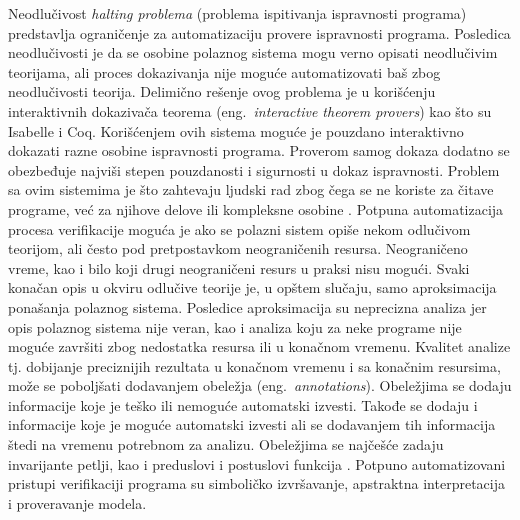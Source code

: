 \documentclass[12pt,oneside]{memoir}
\begin{document}
Neodlučivost \textit{halting problema} (problema ispitivanja ispravnosti programa) predstavlja ograničenje za automatizaciju provere ispravnosti programa. Posledica neodlučivosti je da se osobine polaznog sistema mogu verno opisati neodlučivim teorijama, ali proces dokazivanja nije moguće automatizovati baš zbog neodlučivosti teorija. Delimično rešenje ovog problema je u korišćenju interaktivnih dokazivača teorema (eng.~\textit{interactive theorem provers}) kao što su Isabelle i Coq. Korišćenjem ovih sistema moguće je pouzdano interaktivno dokazati razne osobine ispravnosti programa. Proverom samog dokaza dodatno se obezbeđuje najviši stepen pouzdanosti i sigurnosti u dokaz ispravnosti. Problem sa ovim sistemima je što zahtevaju ljudski rad zbog čega se ne koriste za čitave programe, već za njihove delove ili kompleksne osobine \cite{mvj}. 
Potpuna automatizacija procesa verifikacije moguća je ako se polazni sistem opiše nekom odlučivom teorijom, ali često pod pretpostavkom neograničenih resursa. Neograničeno vreme, kao i bilo koji drugi neograničeni resurs u praksi nisu mogući. Svaki konačan opis u okviru odlučive teorije je, u opštem slučaju, samo aproksimacija ponašanja polaznog sistema. Posledice aproksimacija su neprecizna analiza jer opis polaznog sistema nije veran, kao i analiza koju za neke programe nije moguće završiti zbog nedostatka resursa ili u konačnom vremenu. 
Kvalitet analize tj. dobijanje preciznijih rezultata u konačnom vremenu i sa konačnim resursima, može se poboljšati dodavanjem obeležja (eng.~\textit{annotations}). Obeležjima se dodaju informacije koje je teško ili nemoguće automatski izvesti. Takođe se dodaju i informacije koje je moguće automatski izvesti ali se dodavanjem tih informacija štedi na vremenu potrebnom za analizu. Obeležjima se najčešće zadaju invarijante petlji, kao i preduslovi i postuslovi funkcija \cite{mvj}. 
Potpuno automatizovani pristupi verifikaciji programa su simboličko izvršavanje, apstraktna interpretacija i proveravanje modela. 
\end{document}
